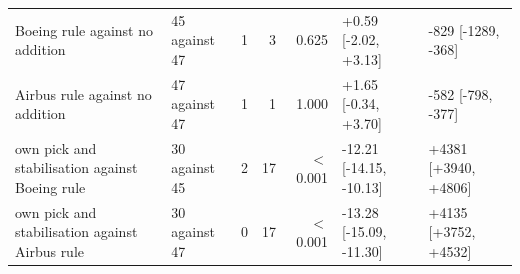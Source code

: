 \begin{tabular}{@{}l l r r r l l@{}}
\quad Boeing rule against no addition & 45 against 47 & 1 & 3 & 0.625 & +0.59 [-2.02, +3.13] & -829 [-1289, -368] \\
\quad Airbus rule against no addition & 47 against 47 & 1 & 1 & 1.000 & +1.65 [-0.34, +3.70] & -582 [-798, -377] \\
\quad own pick and stabilisation against Boeing rule & 30 against 45 & 2 & 17 & $<$0.001 & -12.21 [-14.15, -10.13] & +4381 [+3940, +4806] \\
\quad own pick and stabilisation against Airbus rule & 30 against 47 & 0 & 17 & $<$0.001 & -13.28 [-15.09, -11.30] & +4135 [+3752, +4532] \\
\bottomrule
\end{tabular}
